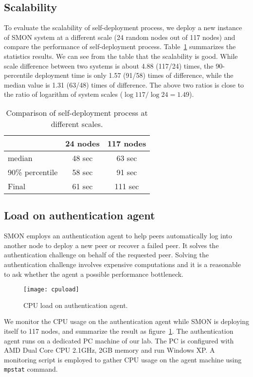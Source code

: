 \subsection{Scalability}

To evaluate the scalability of self-deployment process, we
deploy a new instance of SMON system at a different scale
(24 random nodes out of 117 nodes) and compare the
performance of self-deployment process.
Table~\ref{tbl:scalability} summarizes the statistics
results.  We can see from the table that the scalability is
good.  While scale difference between two systems is about
4.88 (117/24) times, the 90-percentile deployment time is
only 1.57 (91/58) times of difference, while the median
value is 1.31 (63/48) times of difference.  The above two
ratios is close to the ratio of logarithm of system scales
($\log 117 / \log 24 = 1.49$).

\begin{table}[h]
\centering
\begin{tabular}{|l|c|c|}
\hline
  & 24 nodes & 117 nodes\\
\hline
median & 48 sec & 63 sec \\
\hline
90\% percentile & 58 sec & 91 sec\\
\hline
Final & 61 sec & 111 sec\\
\hline
\end{tabular}
\caption{Comparison of self-deployment process at different
scales.}
\label{tbl:scalability}
\end{table}

\subsection{Load on authentication agent}

SMON employs an authentication agent to help peers
automatically log into another node to deploy a new peer or
recover a failed peer. It solves the authentication
challenge on behalf of the requested peer. Solving the
authentication challenge involves expensive computations and
it is a reasonable to ask whether the agent a possible
performance bottleneck.

\begin{figure}[h]
\centering
\texttt{[image: cpuload]}
\caption{CPU load on authentication agent.}
\label{fig:agentload}
\end{figure}

We monitor the CPU usage on the authentication agent while
SMON is deploying itself to 117 nodes, and summarize the
result as figure~\ref{fig:agentload}. The authentication
agent runs on a dedicated PC machine of our lab. The PC is
configured with AMD Dual Core CPU 2.1GHz, 2GB memory and run
Windows XP. A monitoring script is employed to gather CPU
usage on the agent machine using \texttt{mpstat} command.

